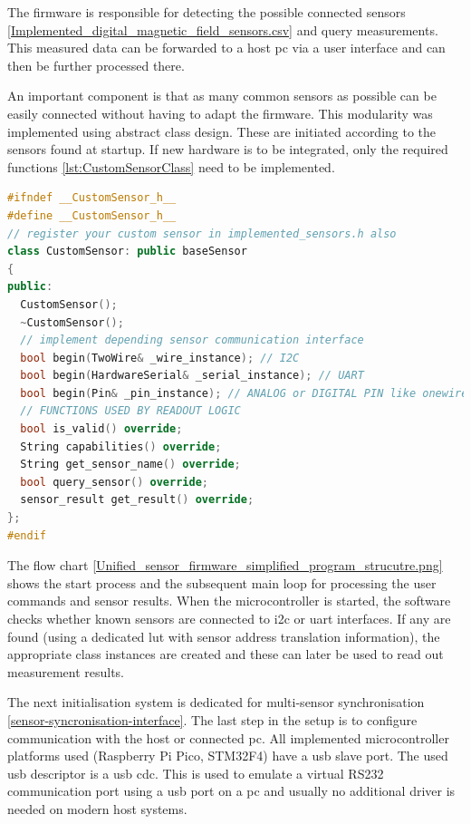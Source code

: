 The firmware is responsible for detecting the possible connected sensors
\ref{Implemented_digital_magnetic_field_sensors.csv} and query
measurements. This measured data can be forwarded to a host \gls{pc} via
a user interface and can then be further processed there.

An important component is that as many common sensors as possible can be
easily connected without having to adapt the firmware. This modularity
was implemented using abstract class design. These are initiated
according to the sensors found at startup. If new hardware is to be
integrated, only the required functions \ref{lst:CustomSensorClass} need
to be implemented.

\begin{lstlisting}[language={C++}, caption={CustomSensor-Class for adding new sensor hardware support}, label=lst:CustomSensorClass]
#ifndef __CustomSensor_h__
#define __CustomSensor_h__
// register your custom sensor in implemented_sensors.h also
class CustomSensor: public baseSensor
{
public:
  CustomSensor();
  ~CustomSensor();
  // implement depending sensor communication interface
  bool begin(TwoWire& _wire_instance); // I2C
  bool begin(HardwareSerial& _serial_instance); // UART
  bool begin(Pin& _pin_instance); // ANALOG or DIGITAL PIN like onewire
  // FUNCTIONS USED BY READOUT LOGIC
  bool is_valid() override;
  String capabilities() override;
  String get_sensor_name() override;
  bool query_sensor() override;
  sensor_result get_result() override;        
};
#endif
\end{lstlisting}

The flow chart
\ref{Unified_sensor_firmware_simplified_program_strucutre.png} shows the
start process and the subsequent main loop for processing the user
commands and sensor results. When the microcontroller is started, the
software checks whether known sensors are connected to \gls{i2c} or
\gls{uart} interfaces. If any are found (using a dedicated \gls{lut}
with sensor address translation information), the appropriate class
instances are created and these can later be used to read out
measurement results.

The next initialisation system is dedicated for multi-sensor
synchronisation \ref{sensor-syncronisation-interface}. The last step in
the setup is to configure communication with the host or connected
\gls{pc}. All implemented microcontroller platforms used (Raspberry Pi
Pico, STM32F4) have a \gls{usb} slave port. The used usb descriptor is a
\gls{usb} \gls{cdc}. This is used to emulate a virtual RS232
communication port using a \gls{usb} port on a \gls{pc} and usually no
additional driver is needed on modern host systems.

